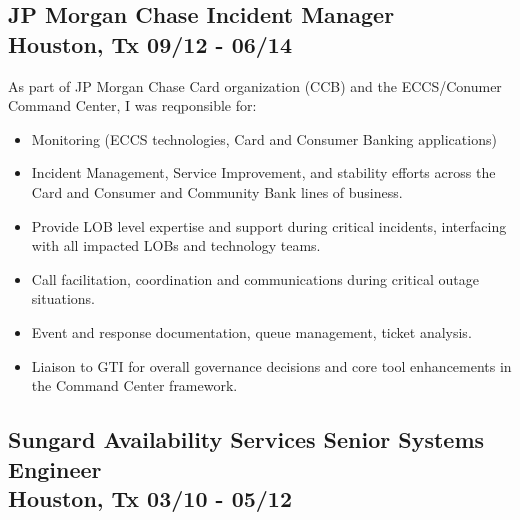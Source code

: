 \documentclass{article}
\begin{document}
  \subsection{JP Morgan Chase \hfill Incident Manager\\
    Houston, Tx \hfill 09/12 - 06/14
  }

  As part of JP Morgan Chase Card organization (CCB) and the ECCS/Conumer Command Center, I was reqponsible for:\\
  \begin{itemize}
  \item Monitoring (ECCS technologies, Card and Consumer Banking applications)
  \item Incident Management, Service Improvement, and stability efforts across the Card and Consumer and Community Bank lines of business.
  \item Provide LOB level expertise and support during critical incidents, interfacing with all impacted LOBs and technology teams.
  \item Call facilitation, coordination and communications during critical outage situations.
  \item Event and response documentation, queue management, ticket analysis.
  \item Liaison to GTI for overall governance decisions and core tool enhancements in the Command Center framework.
  \end{itemize}


  \subsection{Sungard Availability Services \hfill Senior Systems Engineer\\
    Houston, Tx \hfill 03/10 - 05/12
  }
\end{document}
